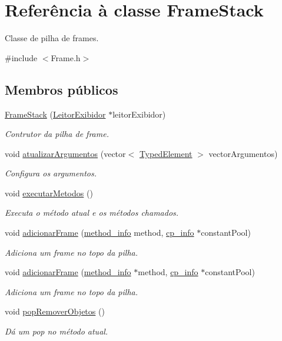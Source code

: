 \hypertarget{classFrameStack}{}\section{Referência à classe Frame\+Stack}
\label{classFrameStack}


Classe de pilha de frames.  




{\ttfamily \#include $<$Frame.\+h$>$}

\subsection*{Membros públicos}
\begin{DoxyCompactItemize}
\item 
\hyperlink{classFrameStack_a15d2d0d6497cd5d398fdc1b9862a1e3a}{Frame\+Stack} (\hyperlink{classLeitorExibidor}{Leitor\+Exibidor} $\ast$leitor\+Exibidor)
\begin{DoxyCompactList}\small\item\em Contrutor da pilha de frame. \end{DoxyCompactList}\item 
void \hyperlink{classFrameStack_a9e7308944f41d892a5a01566d85cad8f}{atualizar\+Argumentos} (vector$<$ \hyperlink{BasicTypes_8h_a97b332303b1262282599e6ede0637b82}{Typed\+Element} $>$ vector\+Argumentos)
\begin{DoxyCompactList}\small\item\em Configura os argumentos. \end{DoxyCompactList}\item 
void \hyperlink{classFrameStack_a87fc1ba2264b6818fc135ea507154b55}{executar\+Metodos} ()
\begin{DoxyCompactList}\small\item\em Executa o método atual e os métodos chamados. \end{DoxyCompactList}\item 
void \hyperlink{classFrameStack_aee31df6406a899bbf581eea9fc5545e6}{adicionar\+Frame} (\hyperlink{structmethod__info}{method\+\_\+info} method, \hyperlink{structcp__info}{cp\+\_\+info} $\ast$constant\+Pool)
\begin{DoxyCompactList}\small\item\em Adiciona um frame no topo da pilha. \end{DoxyCompactList}\item 
void \hyperlink{classFrameStack_a7bb4b64eece0c146fc647636397c572c}{adicionar\+Frame} (\hyperlink{structmethod__info}{method\+\_\+info} $\ast$method, \hyperlink{structcp__info}{cp\+\_\+info} $\ast$constant\+Pool)
\begin{DoxyCompactList}\small\item\em Adiciona um frame no topo da pilha. \end{DoxyCompactList}\item 
void \hyperlink{classFrameStack_a95dd5d1d253758f1fa7a4a2371ff1545}{pop\+Remover\+Objetos} ()
\begin{DoxyCompactList}\small\item\em Dá um pop no método atual. \end{DoxyCompactList}\end{DoxyCompactItemize}
